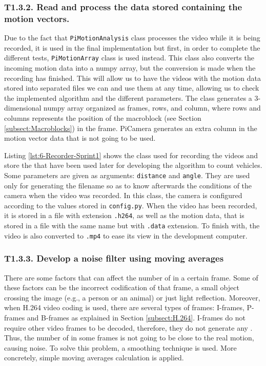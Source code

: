 \subsubsection{T1.3.2. Read and process the data stored containing the motion vectors.}
Due to the fact that \texttt{PiMotionAnalysis} class processes the video while it is being recorded, it is used in the final implementation but first, in order to complete the different tests, \texttt{PiMotionArray} class is used instead. This class also converts the incoming motion data into a numpy array, but the conversion is made when the recording has finished. This will allow us to have the videos with the motion data stored into separated files we can and use them at any time, allowing us to check the implemented algorithm and the different parameters. The class generates a 3-dimensional numpy array organized as frames, rows, and column, where rows and columns represents the position of the macroblock (see Section  \ref{subsect:Macroblocks}) in the frame. PiCamera generates an extra column in the motion vector data that is not going to be used.

Listing \ref{lst:6-Recorder-Sprint1} shows the class used for recording the videos and store the  that have been used later for developing the algorithm to count vehicles. Some parameters are given as arguments: \texttt{distance} and \texttt{angle}. They are used only for generating the filename so as to know afterwards the conditions of the camera when the video was recorded. In this class, the camera is configured according to the values stored in \texttt{config.py}. When the video has been recorded, it is stored in a file with extension \texttt{.h264}, as well as the motion data, that is stored in a file with the same name but with \texttt{.data} extension. To finish with, the video is also converted to \texttt{.mp4} to ease its view in the development computer. 




\subsubsection{T1.3.3. Develop a noise filter using moving averages}
There are some factors that can affect the number of  in a certain frame. Some of these factors can be the incorrect codification of that frame, a small object crossing the image (e.g., a person or an animal) or just light reflection. Moreover, when H.264 video coding is used, there are several types of frames: I-frames, P-frames and B-frames as explained in Section \ref{subsect:H.264}. I-frames do not require other video frames to be decoded, therefore, they do not generate any . Thus, the number of  in some frames is not going to be close to the real motion, causing noise. To solve this problem, a smoothing technique is used. More concretely, simple moving averages calculation is applied.

